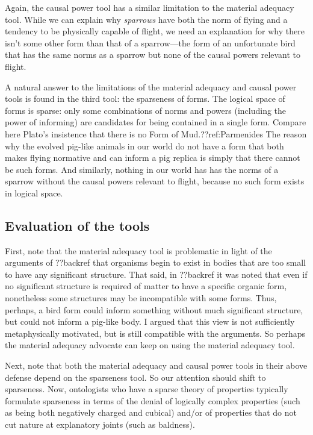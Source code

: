 Again, the causal power tool has a similar limitation to the material adequacy tool. While we can explain why \textit{sparrows}
have both the norm of flying and a tendency to be physically capable of flight, we need an explanation for why there isn't some 
other form than that of a sparrow---the form of an unfortunate bird that has the same norms as a sparrow but none of the causal 
powers relevant to flight. 

A natural answer to the limitations of the material adequacy and causal power tools is found in the third tool: the sparseness 
of forms. The logical space of forms is sparse: only some combinations of norms and powers (including 
the power of informing) are candidates for being contained in a single form. Compare here Plato's insistence that there is 
no Form of Mud.??ref:Parmenides The reason why the evolved pig-like animals in our world do not have a form that both makes 
flying normative and can inform a pig replica is simply that there cannot be such forms. And similarly, nothing in our world 
has has the norms of a sparrow without the causal powers relevant to flight, because no such form exists in logical space.

\subsection{Evaluation of the tools}
First, note that the material adequacy tool is problematic in light of the arguments of ??backref that organisms begin 
to exist in bodies that are too small to have any significant structure. That said, in ??backref it was noted that even 
if no significant structure is required of matter to have a specific organic form, nonetheless some structures may be 
incompatible with some forms. Thus, perhaps, a bird form could inform something without much significant structure, but 
could not inform a pig-like body. I argued that this view is not sufficiently metaphysically motivated, but is still
compatible with the arguments. So perhaps the material adequacy advocate can keep on using the material adequacy tool.

Next, note that both the material adequacy and causal power tools in their above defense depend on the sparseness tool.
So our attention should shift to sparseness. Now, ontologists who have a sparse theory of properties typically formulate
sparseness in terms of the denial of logically complex properties (such as being both negatively charged and cubical)
and/or of properties that do not cut nature at explanatory joints (such as baldness). 

